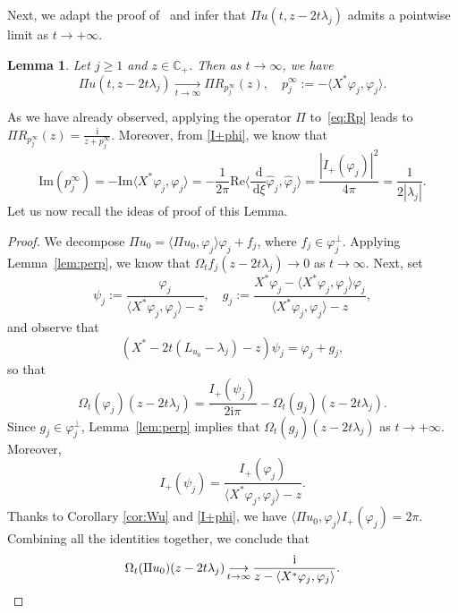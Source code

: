 \documentclass[english, 12pt]{amsart}%
\newcommand{\C}{\mathbb{C}}
\newcommand{\ii}{\mathrm{i}}
\newcommand{\dd}{\,\mathrm{d}}
\renewcommand{\Im}{\mathrm{Im}}
\renewcommand{\Re}{\mathrm{Re}}
\newcommand{\longrightarroww}[2] {\mathop{\longrightarrow}\limits_{#1}^{#2}}
\newtheorem{lemma}[definition]{Lemma}
\numberwithin{equation}{section}
\begin{document}
Next, we adapt the proof of~\cite[Lemma 3.2]{GassotGM26} and infer that   $\Pi u(t,z-2t\lambda_j)$ admits a pointwise limit as $t\to+\infty$. 
\begin{lemma}\label{lem:pointwise}
Let $j\geq 1$ and $z\in\C_+$. Then as $t\to\infty$, we have
\[
\Pi u(t,z-2t\lambda_j)\longrightarroww{t\to\infty}{} \Pi R_{p_j^\infty}(z),
\quad
p_j^{\infty}:=-\langle X^*\varphi_j,\varphi_j\rangle.
\]
\end{lemma}
As we  have already observed, applying the operator $\Pi$ to~\eqref{eq:Rp} leads to $\Pi R_{p_j^{\infty}}(z)=\frac{\ii}{z+p_j^{\infty}}$. Moreover, from \eqref{I+phi}, we know that 
\begin{equation}\label{eq:impinfty}
 \Im( p_j^\infty) =-\Im \langle X^*\varphi_j,\varphi_j\rangle =-\frac{1}{2\pi}\Re \langle \frac{\dd}{\dd\xi}\widehat \varphi_j,\widehat\varphi_j\rangle =\frac{|I_+(\varphi_j)|^2} {4\pi}=\frac{1}{2|\lambda_j|}.
\end{equation}
Let us now recall the ideas of proof of this Lemma.
\begin{proof}
We decompose $\Pi u_0=\langle \Pi u_0,\varphi_j\rangle \varphi_j+f_j$, where $f_j\in\varphi_j^\perp$. Applying Lemma~\ref{lem:perp}, we know that $\Omega_tf_j(z-2t\lambda_j)\to 0$ as $t\to\infty$.
Next, set
\[
\psi_j:=\frac{\varphi_j}{\langle X^*\varphi_j,\varphi_j\rangle-z},
\quad
g_j:=\frac{X^*\varphi_j-\langle X^*\varphi_j,\varphi_j\rangle\varphi_j}{\langle X^*\varphi_j,\varphi_j\rangle-z},
\]
and observe that
\[
(X^*-2t(L_{u_0}-\lambda_j)-z)\psi_j=\varphi_j+g_j,
\]
so that
\[
\Omega_t(\varphi_j)(z-2t\lambda_j)=\frac{I_+(\psi_j)}{2\ii\pi}-\Omega_t(g_j)(z-2t\lambda_j).
\]
Since $g_j\in\varphi_j^{\perp}$, Lemma~\ref{lem:perp} implies that $\Omega_t(g_j)(z-2t\lambda_j)$ as $t\to+\infty$. Moreover,
\[
I_+(\psi_j)=\frac{I_+(\varphi_j)}{\langle X^*\varphi_j,\varphi_j\rangle -z}.
\]
Thanks to Corollary \ref{cor:Wu} and \eqref{I+phi}, we have $\langle \Pi u_0,\varphi_j\rangle I_+(\varphi_j)=2\pi$. Combining all the identities together, we conclude that
\[
\Omega_t(\Pi u_0)(z-2t\lambda_j)\longrightarroww{t\to\infty}{}\frac{\ii}{z-\langle X^*\varphi_j,\varphi_j\rangle}.
\qedhere
\]
\end{proof}
\end{document}
